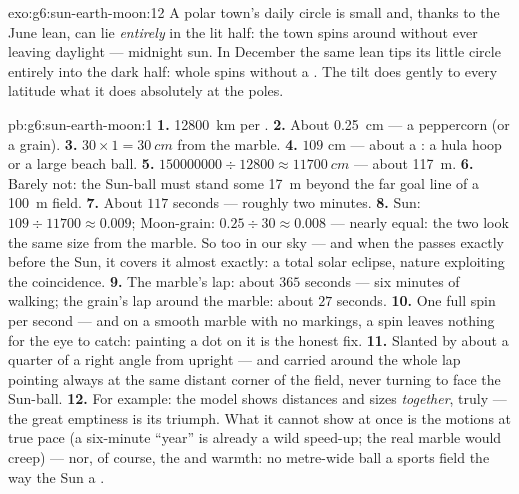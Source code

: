 \begin{solution}{exo:g6:sun-earth-moon:12}
A polar town's daily circle is small and, thanks to the June
lean, can lie \emph{entirely} in the lit half: the town spins
around without ever leaving daylight --- midnight sun. In
December the same lean tips its little circle entirely into the
dark half: whole spins without a . The tilt does gently to
every latitude what it does absolutely at the poles.
\end{solution}

\begin{solution}{pb:g6:sun-earth-moon:1}
\textbf{1.} \qty{12800}{km} per .
\textbf{2.} About \qty{0.25}{cm} --- a peppercorn (or a grain).
\textbf{3.} $30 \times 1 = \qty{30}{cm}$ from the marble.
\textbf{4.} $109$ cm --- about a : a hula hoop or a large
beach ball.
\textbf{5.} $150000000 \div 12800 \approx \qty{11700}{cm}$ ---
about \qty{117}{m}.
\textbf{6.} Barely not: the Sun-ball must stand some \qty{17}{m}
beyond the far goal line of a \qty{100}{m} field.
\textbf{7.} About $117$ seconds --- roughly two minutes.
\textbf{8.} Sun: $109 \div 11700 \approx 0.009$; Moon-grain:
$0.25 \div 30 \approx 0.008$ --- nearly equal: the two look the
same size from the marble. So too in our sky --- and when the
 passes exactly before the Sun, it covers it almost exactly:
a total solar eclipse, nature exploiting the coincidence.
\textbf{9.} The marble's lap: about $365$ seconds --- six
minutes of walking; the grain's lap around the marble: about
$27$ seconds.
\textbf{10.} One full spin per second --- and on a smooth
 marble with no markings, a spin leaves nothing for
the eye to catch: painting a dot on it is the honest fix.
\textbf{11.} Slanted by about a quarter of a right angle from
upright --- and carried around the whole lap pointing always at
the same distant corner of the field, never turning to face the
Sun-ball.
\textbf{12.} For example: the model shows distances and sizes
\emph{together}, truly --- the great emptiness is its triumph.
What it cannot show at once is the motions at true pace (a
six-minute ``year'' is already a wild speed-up; the real marble
would creep) --- nor, of course, the  and warmth: no
metre-wide ball  a sports field the way the Sun  a
.
\end{solution}
